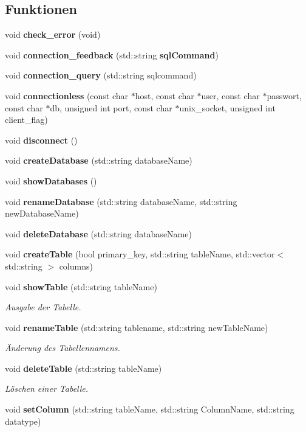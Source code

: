 \subsection*{Funktionen}
\begin{DoxyCompactItemize}
\item 
void \textbf{ check\+\_\+error} (void)
\item 
void \textbf{ connection\+\_\+feedback} (std\+::string \textbf{ sql\+Command})
\item 
void \textbf{ connection\+\_\+query} (std\+::string sqlcommand)
\item 
void \textbf{ connectionless} (const char $\ast$host, const char $\ast$user, const char $\ast$passwort, const char $\ast$db, unsigned int port, const char $\ast$unix\+\_\+socket, unsigned int client\+\_\+flag)
\item 
void \textbf{ disconnect} ()
\item 
void \textbf{ create\+Database} (std\+::string database\+Name)
\item 
void \textbf{ show\+Databases} ()
\item 
void \textbf{ rename\+Database} (std\+::string database\+Name, std\+::string new\+Database\+Name)
\item 
void \textbf{ delete\+Database} (std\+::string database\+Name)
\item 
void \textbf{ create\+Table} (bool primary\+\_\+key, std\+::string table\+Name, std\+::vector$<$ std\+::string $>$ columns)
\item 
void \textbf{ show\+Table} (std\+::string table\+Name)
\begin{DoxyCompactList}\small\item\em Ausgabe der Tabelle. \end{DoxyCompactList}\item 
void \textbf{ rename\+Table} (std\+::string tablename, std\+::string new\+Table\+Name)
\begin{DoxyCompactList}\small\item\em Änderung des Tabellennamens. \end{DoxyCompactList}\item 
void \textbf{ delete\+Table} (std\+::string table\+Name)
\begin{DoxyCompactList}\small\item\em Löschen einer Tabelle. \end{DoxyCompactList}\item 
void \textbf{ set\+Column} (std\+::string table\+Name, std\+::string Column\+Name, std\+::string datatype)

\end{DoxyCompactItemize}
